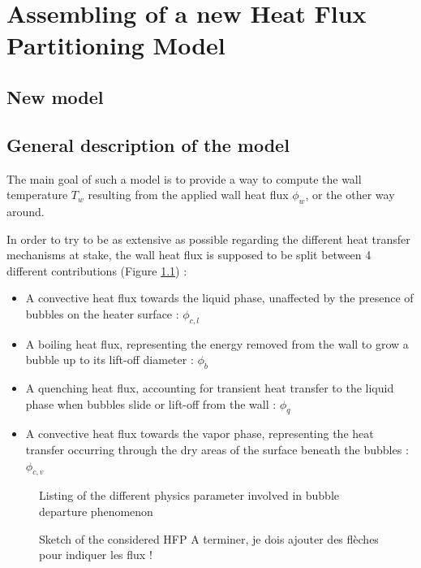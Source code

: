 
\chapter{Assembling of a new Heat Flux Partitioning Model} %

\label{ch:NewHFP} %


\section{New model}


\section{General description of the model}
\label{sec:model}

The main goal of such a model is to provide a way to compute the wall temperature $T_{w}$ resulting from the applied wall heat flux $\phi_{w}$, or the other way around.

\npar
In order to try to be as extensive as possible regarding the different heat transfer mechanisms at stake, the wall heat flux is supposed to be split between 4 different contributions (Figure \ref{fig:HFP}) :

\begin{itemize}
\item A convective heat flux towards the liquid phase, unaffected by the presence of bubbles on the heater surface : $\phi_{c,l}$
\item A boiling heat flux, representing the energy removed from the wall to grow a bubble up to its lift-off diameter : $\phi_{b}$
\item A quenching heat flux, accounting for transient heat transfer to the liquid phase when bubbles slide or lift-off from the wall : $\phi_{q}$
\item A convective heat flux towards the vapor phase, representing the heat transfer occurring through the dry areas of the surface beneath the bubbles : $\phi_{c,v}$
\end{itemize}


\begin{figure}[h!]
\centering

\caption{Sketch of the considered HFP  {\color{red} A terminer, je dois ajouter des flèches pour indiquer les flux !}}
\label{fig:HFP}Listing of the different physics parameter involved in bubble departure phenomenon 

\end{figure}


